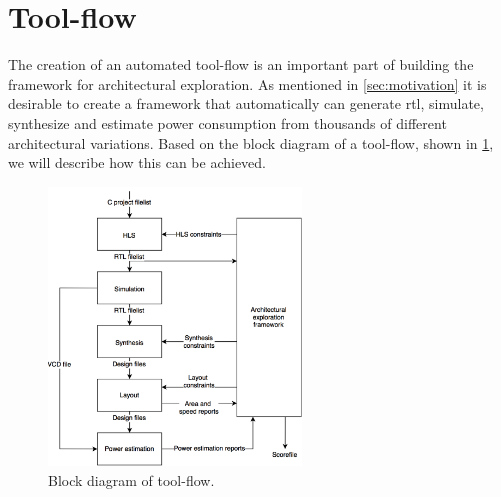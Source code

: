 \section{Tool-flow}
The creation of an automated tool-flow is an important part of building the framework for architectural exploration. As mentioned in \cref{sec:motivation} it is desirable to create a framework that automatically can generate \gls{rtl}, simulate, synthesize and estimate power consumption from thousands of different architectural variations. Based on the block diagram of a tool-flow, shown in \cref{fig:toolflowblock}, we will describe how this can be achieved. 
\begin{figure}[hbpt]
\centering
\includegraphics[width=0.6\textwidth]{../figs/Toolflow.png}
\caption{\label{fig:toolflowblock}Block diagram of tool-flow.}
\end{figure}
